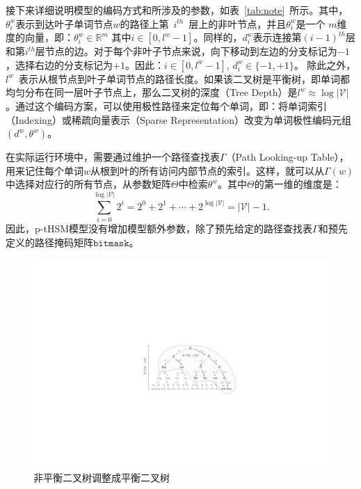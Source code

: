 接下来详细说明模型的编码方式和所涉及的参数，如表~\ref{tab:note}~所示。其中，$\theta_i^w $表示到达叶子单词节点$w$的路径上第~$i^{th}$~层上的非叶节点，并且$\theta_i ^ w$是一个 $m$维度的向量，即：$\theta_i^w \in\mathbb{R}^m $ 其中$ i \in [0, l^w-1] $。同样的，$ d_i^w $表示连接第$(i-1)^{th}$层和第$i^{th}$层节点的边。对于每个非叶子节点来说，向下移动到左边的分支标记为$ -1 $，选择右边的分支标记为$ + 1 $。因此：$i\in[0,l^w-1]$, $d_i^w\in \{-1,+1\}$。 除此之外， $l^w$~表示从根节点到叶子单词节点的路径长度。如果该二叉树是平衡树，即单词都均匀分布在同一层叶子节点上，那么二叉树的深度（Tree Depth）是$l^w\approx \log \mathcal{|V|}$ 。通过这个编码方案，可以使用极性路径来定位每个单词，即：将单词索引（Indexing）或稀疏向量表示（Sparse Representation）改变为单词极性编码元组$(d^w,\theta^w)$。



在实际运行环境中，需要通过维护一个路径查找表$\Gamma$（Path Looking-up Table），用来记住每个单词$ w $从根到叶的所有访问内部节点的索引。这样，就可以从$ \Gamma(w)$中选择对应行的所有节点，从参数矩阵${\Theta} $中检索$ \theta ^ w $。其中${\Theta} $的第一维的维度是：
\begin{equation}\label{equ:sums}
\sum_{i=0}^{\log \mathcal{|V|}}{2^i} =2^0+2^1+\cdots+2^{\log \mathcal{|V|}}= \mathcal{|V|} -1.
\end{equation}
因此，p-tHSM模型没有增加模型额外参数，除了预先给定的路径查找表$\Gamma$和预先定义的路径掩码矩阵$\mathtt{bitmask}$。


\begin{figure}[!t]
  \centering
\includegraphics[width=0.85\linewidth]{./figures/thsm-example-mask.pdf}
\caption{非平衡二叉树调整成平衡二叉树}\label{fig:case_thsm_mask}
\end{figure}




